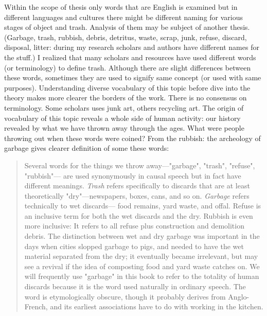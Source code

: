 Within the scope of thesis only words that are English is examined but in different languages and cultures there might be different naming for various stages of object and trash. Analysis of them may be subject of another thesis. (Garbage, trash, rubbish, debris, detritus, waste, scrap, junk, refuse, discard, disposal, litter: during my research scholars and authors have different names for the stuff.) I realized that many scholars and resources have used different words (or terminology) to define trash. Although there are slight differences between these words, sometimes they are used to signify same concept (or used with same purposes). Understanding diverse vocabulary of this topic before dive into the theory makes more clearer the borders of the work. There is no consensus on terminology. Some scholars uses junk art, others recycling art. The origin of vocabulary of this topic reveals a whole side of human activity: our history revealed by what we have thrown away through the ages. What were people throwing out when these words were coined? From the rubbish: the archeology of garbage gives clearer definition of some these words:

\begin{quote}
Several words for the things we throw away---"garbage", "trash", "refuse", "rubbish"--- are used synonymously in causal speech but in fact have different meanings. \textit{Trash} refers specifically to discards that are at least theoretically "dry"---newspapers, boxes, cans, and so on. \textit{Garbage} refers technically to wet discards--- food remains, yard waste, and offal. Refuse is an inclusive term for both the wet discards and the dry. Rubbish is even more inclusive: It refers to all refuse plus construction and demolition debris. The distinction between wet and dry garbage was important in the days when cities slopped garbage to pigs, and needed to have the wet material separated from the dry; it eventually became irrelevant, but may see a revival if the idea of composting food and yard waste catches on. We will frequently use "garbage" in this book to refer to the totality of human discards because it is the word used naturally in ordinary speech. The word is etymologically obscure, though it probably derives from Anglo-French, and its earliest associations have to do with working in the kitchen.
\end{quote}



